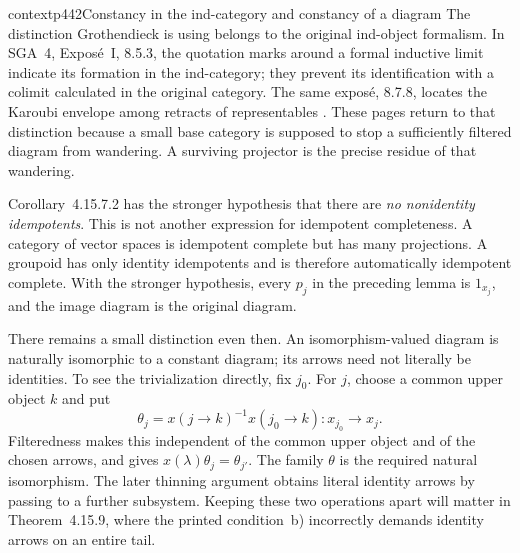 \begin{dcomment}{context}{p442}{Constancy in the ind-category and constancy of a diagram}
The distinction Grothendieck is using belongs to the original ind-object formalism. In SGA~4, Expos\'e~I, 8.5.3, the quotation marks around a formal inductive limit indicate its formation in the ind-category; they prevent its identification with a colimit calculated in the original category. The same expos\'e, 8.7.8, locates the Karoubi envelope among retracts of representables \citep{SGA4I1972}. These pages return to that distinction because a small base category is supposed to stop a sufficiently filtered diagram from wandering. A surviving projector is the precise residue of that wandering.

Corollary~4.15.7.2 has the stronger hypothesis that there are \emph{no nonidentity idempotents}. This is not another expression for idempotent completeness. A category of vector spaces is idempotent complete but has many projections. A groupoid has only identity idempotents and is therefore automatically idempotent complete. With the stronger hypothesis, every $p_j$ in the preceding lemma is $1_{x_j}$, and the image diagram is the original diagram.

There remains a small distinction even then. An isomorphism-valued diagram is naturally isomorphic to a constant diagram; its arrows need not literally be identities. To see the trivialization directly, fix $j_0$. For $j$, choose a common upper object $k$ and put
\[
\theta_j=x(j\to k)^{-1}x(j_0\to k):x_{j_0}\longrightarrow x_j.
\]
Filteredness makes this independent of the common upper object and of the chosen arrows, and gives $x(\lambda)\theta_j=\theta_{j'}$. The family $\theta$ is the required natural isomorphism. The later thinning argument obtains literal identity arrows by passing to a further subsystem. Keeping these two operations apart will matter in Theorem~4.15.9, where the printed condition~b) incorrectly demands identity arrows on an entire tail.
\end{dcomment}

